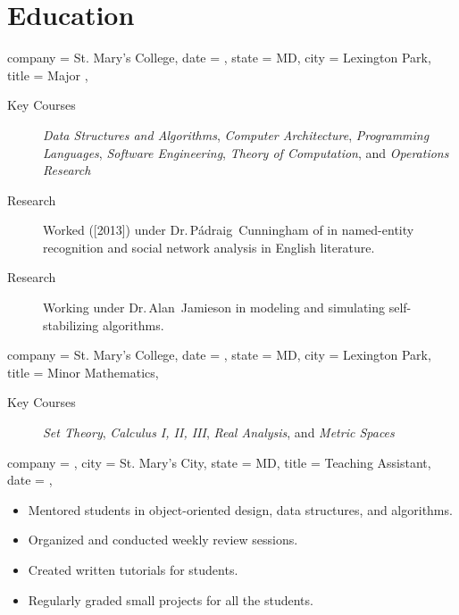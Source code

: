 \documentclass{bettercv}
\newcommand \course[1]   {\textit{#1}}
\begin{document}
\section{Education}
\begin{position}
  {
    company = St. Mary's College,
    date    = ,
    state   = MD,
    city    = Lexington Park,
    title   = Major ,
  }

\begin{description}
\item[Key Courses]
  \course{Data Structures and Algorithms},
  \course{Computer Architecture},
  \course{Programming Languages},
  \course{Software Engineering},
  \course{Theory of Computation},
  and \course{Operations Research}
\item[Research] Worked ([2013]) under
  Dr.\,P\'adraig~Cunningham of \ucd in named-entity recognition and
  social network analysis in English literature.
\item[Research] Working under Dr.\,Alan~Jamieson in modeling and
  simulating self-stabilizing algorithms.
\end{description}
\end{position}

\begin{position}
  {
    company = St. Mary's College,
    date    = ,
    state   = MD,
    city    = Lexington Park,
    title   = Minor \Dash Mathematics,
  }

  \begin{description}
  \item[Key Courses]
    \course{Set Theory},
    \course{Calculus I, II, III},
    \course{Real Analysis},
    and \course{Metric Spaces}
  \end{description}
\end{position}

\begin{position}
  {
    company = \smcmmathcs,
    city    = St. Mary's City,
    state   = MD,
    title   = Teaching Assistant,
    date    = ,
  }

\begin{itemize}
\item Mentored students in object-oriented design, data structures, and algorithms.
\item Organized and conducted weekly review sessions.
\item Created written tutorials for students.
\item Regularly graded small projects for all the students.
\end{itemize}
\end{position}
\end{document}

